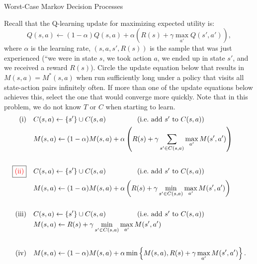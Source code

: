 \begin{problem}[]{Worst-Case Markov Decision Processes}
\vspace{-0.2cm}
\begin{question}[5]
  Recall that the Q-learning update for maximizing expected utility is:
  \vspace{-0.1cm}
  \begin{equation*}
    Q(s,a) \leftarrow (1 - \alpha) Q(s,a)
    + \alpha \left( R(s) + \gamma \max_{a'} Q(s', a') \right),
  \end{equation*}
  \vspace{-0.1cm}
  where $\alpha$ is the learning rate, $(s, a, s', R(s))$ is the sample that
  was just experienced (``we were in state $s$, we took action $a$, we ended
  up in state $s'$, and we received a reward $R(s)$).  Circle the update
  equation below that results in $M(s,a) = M^*(s,a)$ when run sufficiently long
  under a policy that visits all state-action pairs infinitely often.  If more
  than one of the update equations below achieves this, select the one that
  would converge more quickly.  Note that in this problem, we do not know $T$
  or $C$ when starting to learn.
\vspace{-0.3cm}
  \begin{align*} 
    \text{{(i)} \ \ } & C(s, a)  \leftarrow \{s'\} \cup C(s,a)
    \qquad\qquad ~ \left(\mbox{i.e.\ add $s'$ to $C(s, a)$}\right)
    \\
    & M(s,a)  \leftarrow (1 - \alpha) M(s,a) + \alpha \left( R(s) + \gamma
    \sum_{s' \in C(s,a)} \max_{a'} M(s', a') \right) \\\\
    \text{\fbox{{\color{red}(ii)}} \ \ } & C(s, a) \leftarrow \{s'\} \cup C(s,a)
    \qquad\qquad ~ \left(\mbox{i.e.\ add $s'$ to $C(s, a)$}\right)
    \\
    & M(s,a)  \leftarrow (1 - \alpha) M(s,a) + \alpha \left( R(s) +
    \gamma \min_{s' \in C(s,a)} \max_{a'} M(s', a') \right) \\\\
    \text{{(iii)} \ \ } & C(s, a)  \leftarrow \{s'\} \cup C(s,a)
    \qquad\qquad ~ \left(\mbox{i.e.\ add $s'$ to $C(s, a)$}\right)
    \\
    & M(s,a) \leftarrow R(s) + \gamma  \min_{s' \in C(s,a)}
    \max_{a'} M(s', a') \\\\
    \text{{(iv)} \ \ } & M(s, a)
    \leftarrow (1 - \alpha) M(s, a) + \alpha \min\left\{
    M(s, a), R(s) + \gamma \max_{a'} M(s', a')\right\}.
  \end{align*}


\end{question}
\end{problem}
